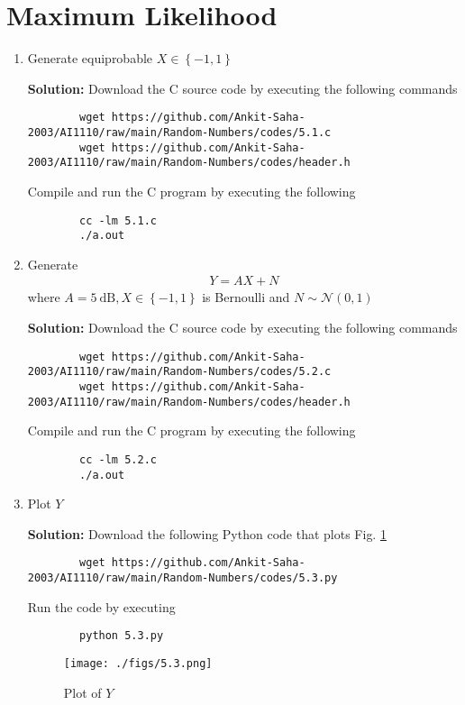 \documentclass[journal,12pt,twocolumn]{IEEEtran}
\newcommand{\solution}{\noindent \textbf{Solution: }}
\providecommand{\cbrak}[1]{\ensuremath{\left\{#1\right\}}}
\providecommand{\gauss}[2]{\mathcal{N}\ensuremath{\left(#1,#2\right)}}
\numberwithin{equation}{section}
\renewcommand\thesection{\arabic{section}}
\begin{document}
	\section{Maximum Likelihood}
	\begin{enumerate}[label=\thesection.\arabic*,ref=\thesection.\theenumi]
	\item Generate equiprobable 	$X \in \cbrak{-1, 1}$
	
	\solution Download the C source code by executing the following commands
	\begin{lstlisting}
		wget https://github.com/Ankit-Saha-2003/AI1110/raw/main/Random-Numbers/codes/5.1.c
		wget https://github.com/Ankit-Saha-2003/AI1110/raw/main/Random-Numbers/codes/header.h
	\end{lstlisting}
	Compile and run the C program by executing the following
	\begin{lstlisting}
		cc -lm 5.1.c
		./a.out
	\end{lstlisting}
	
	\item Generate 
	\begin{align}
		Y = AX+N
	\end{align}
	where $A = 5 ~\mathrm{dB}, X \in \cbrak{-1, 1}$ is Bernoulli and $N \sim \gauss{0}{1}$
	
	\solution Download the C source code by executing the following commands
	\begin{lstlisting}
		wget https://github.com/Ankit-Saha-2003/AI1110/raw/main/Random-Numbers/codes/5.2.c
		wget https://github.com/Ankit-Saha-2003/AI1110/raw/main/Random-Numbers/codes/header.h
	\end{lstlisting}
	Compile and run the C program by executing the following
	\begin{lstlisting}
		cc -lm 5.2.c
		./a.out
	\end{lstlisting}
	
	\item Plot $Y$
	
	\solution  Download the following Python code that plots Fig. \ref{fig-5.3}
	\begin{lstlisting}
		wget https://github.com/Ankit-Saha-2003/AI1110/raw/main/Random-Numbers/codes/5.3.py
	\end{lstlisting}
	Run the code by executing
	\begin{lstlisting}
		python 5.3.py
	\end{lstlisting}
	\begin{figure}
		\centering
		\texttt{[image: ./figs/5.3.png]}
		\caption{Plot of $Y$}
		\label{fig-5.3}
	\end{figure}
	

\end{enumerate}
\end{document}
